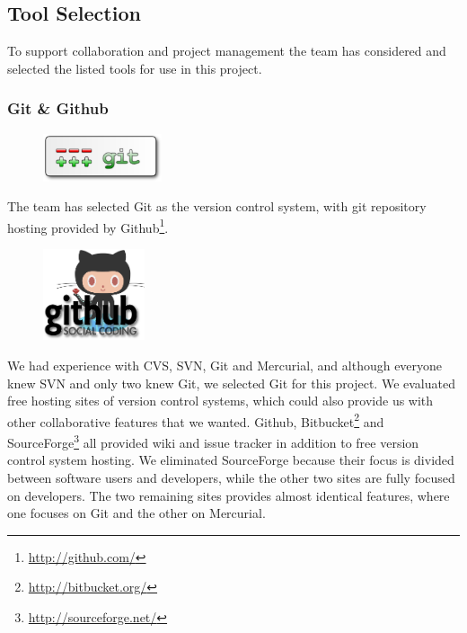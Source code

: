 \subsection{Tool Selection}
To support collaboration and project management the team has considered and
selected the listed tools for use in this project.

\subsubsection{Git \& Github}
\begin{figure}
	\vspace{-20pt}
	\includegraphics[width=3.5cm]{./planning/img/git_logo}
	\vspace{-20pt}
\end{figure}
The team has selected Git as the version control system, with git repository
hosting provided by Github\footnote{\url{http://github.com/}}.

\begin{figure}
	\vspace{-20pt}
	\includegraphics[width=3cm]{./planning/img/github_logo}
	\vspace{-20pt}
\end{figure}
We had experience with CVS, SVN, Git and Mercurial, and although everyone 
knew SVN and only two knew Git, we selected Git for this project. We 
evaluated free hosting sites of version control systems, which could also 
provide us with other collaborative features that we wanted. Github, 
Bitbucket\footnote{\url{http://bitbucket.org/}} and
SourceForge\footnote{\url{http://sourceforge.net/}} all provided wiki and
issue tracker in addition to free version control system hosting. We eliminated 
SourceForge because their focus is divided between software users and 
developers, while the other two sites are fully focused on developers. The 
two remaining sites provides almost identical features, where one focuses on 
Git and the other on Mercurial.

